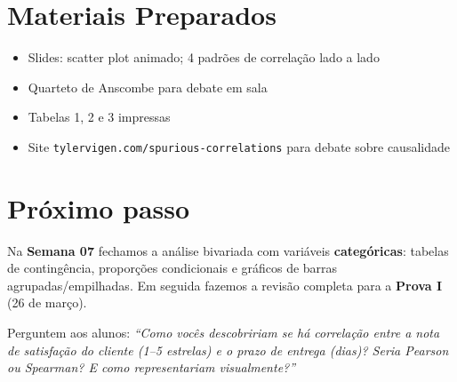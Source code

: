 \section{Materiais Preparados}
\begin{itemize}
  \item Slides: scatter plot animado; 4 padrões de correlação lado a lado
  \item Quarteto de Anscombe para debate em sala
  \item Tabelas 1, 2 e 3 impressas
  \item Site \texttt{tylervigen.com/spurious-correlations} para debate sobre causalidade
\end{itemize}

\section{Próximo passo}

Na \textbf{Semana 07} fechamos a análise bivariada com variáveis
\textbf{categóricas}: tabelas de contingência, proporções condicionais e
gráficos de barras agrupadas/empilhadas. Em seguida fazemos a revisão
completa para a \textbf{Prova I} (26 de março).

Perguntem aos alunos: \textit{``Como vocês descobririam se há correlação
entre a nota de satisfação do cliente (1–5 estrelas) e o prazo de entrega
(dias)? Seria Pearson ou Spearman? E como representariam visualmente?''}
